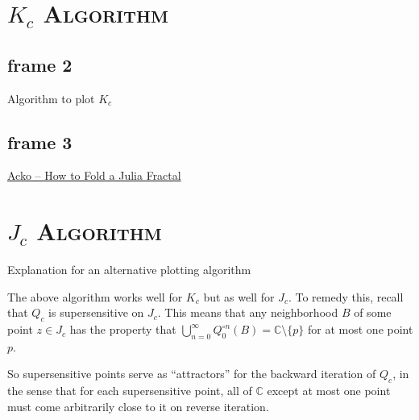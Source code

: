 \documentclass[xcolor=x11names,compress]{beamer}
\renewcommand{\(}{\begin{columns}}
\renewcommand{\)}{\end{columns}}
\newcommand{\<}[1]{\begin{column}{#1}}
\renewcommand{\>}{\end{column}}
\begin{document}
\section{\scshape $K_c$ Algorithm}

\subsection{frame 2}
\begin{frame}

\begin{algorithm}[H]
  \DontPrintSemicolon
  \LinesNumbered


 {
}
\caption{Algorithm to plot $K_c$ }
\end{algorithm}

\end{frame}




\subsection{frame 3}
\begin{frame}

\href{http://acko.net/blog/how-to-fold-a-julia-fractal/}{Acko -- How to Fold a Julia Fractal}

\end{frame}


\section{\scshape $J_c$ Algorithm}

\begin{frame}

Explanation for an alternative plotting algorithm

The above algorithm works well for $K_c$ but as well for $J_c$.
To remedy this, recall that $Q_c$ is supersensitive on $J_c$.
This means that any neighborhood $B$ of some point $z\in J_c$ has
the property that 
$\bigcup_{n=0}^\infty Q_0^{\circ n} (B) = \mathbb{C} \setminus \{p\}$ for at most one point $p$.

So supersensitive points serve as ``attractors'' for the backward iteration of $Q_c$, 
in the sense that for each supersensitive point, all of $\mathbb{C}$ except at most one point
must come arbitrarily close to it on reverse iteration. 


\end{frame}
\end{document}

